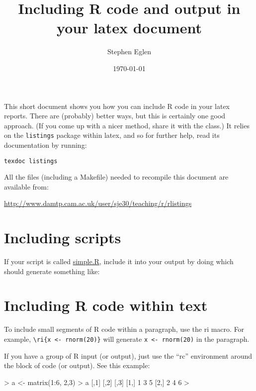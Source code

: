 \documentclass[11pt]{article}
\newcommand{\ri}[1]{\lstinline{#1}}  %
\begin{document}
\title{Including R code and output in your latex document}
\author{Stephen Eglen}
\date{\today}

\maketitle

This short document shows you how you can include R code in your latex
reports.  There are (probably) better ways, but this is certainly one
good approach.  (If you come up with a nicer method, share it with the
class.)  It relies on the \verb+listings+ package within latex, and so
for further help, read its documentation by running:

\begin{verbatim}
texdoc listings
\end{verbatim}

All the files (including a Makefile) needed to recompile this document
are available from:

\url{http://www.damtp.cam.ac.uk/user/sje30/teaching/r/rlistings}



\section{Including scripts}

If your script is called \url{simple.R}, include it into your
output by doing \verb++ which should generate
something like:





\section{Including R code within text}

To include small segments of R code within a paragraph, use the ri
macro.  For example, \verb+\ri{x <- rnorm(20)}+ will generate
\ri{x <- rnorm(20)} in the paragraph.

If you have a group of R input (or output), just use the ``rc''
environment around the block of code (or output).  See this example:

\begin{rc}
> a <- matrix(1:6, 2,3)
> a
     [,1] [,2] [,3]
[1,]    1    3    5
[2,]    2    4    6
> 
\end{rc}
\end{document}
